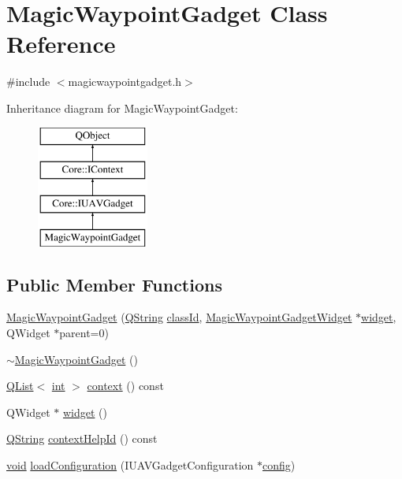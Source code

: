 \hypertarget{class_magic_waypoint_gadget}{\section{Magic\-Waypoint\-Gadget Class Reference}
\label{class_magic_waypoint_gadget}
}


{\ttfamily \#include $<$magicwaypointgadget.\-h$>$}

Inheritance diagram for Magic\-Waypoint\-Gadget\-:\begin{figure}[H]
\begin{center}
\leavevmode
\includegraphics[height=4.000000cm]{class_magic_waypoint_gadget}
\end{center}
\end{figure}
\subsection*{Public Member Functions}
\begin{DoxyCompactItemize}
\item 
\hyperlink{group___g_c_s_control_gadget_plugin_ga7c890e89a9d75c8e6498c9b894ba70ce}{Magic\-Waypoint\-Gadget} (\hyperlink{group___u_a_v_objects_plugin_gab9d252f49c333c94a72f97ce3105a32d}{Q\-String} \hyperlink{group___core_plugin_ga3878fde66a57220608960bcc3fbeef2c}{class\-Id}, \hyperlink{class_magic_waypoint_gadget_widget}{Magic\-Waypoint\-Gadget\-Widget} $\ast$\hyperlink{group___g_c_s_control_gadget_plugin_ga361c7a72cf1a95a2cf36f858d5b9bee5}{widget}, Q\-Widget $\ast$parent=0)
\item 
\hyperlink{group___g_c_s_control_gadget_plugin_ga7caf437fa3df4fc4c30bb259b16d5b89}{$\sim$\-Magic\-Waypoint\-Gadget} ()
\item 
\hyperlink{class_q_list}{Q\-List}$<$ \hyperlink{ioapi_8h_a787fa3cf048117ba7123753c1e74fcd6}{int} $>$ \hyperlink{group___g_c_s_control_gadget_plugin_ga7521519a1bb7dd420c9e4d2f1bf49a2f}{context} () const 
\item 
Q\-Widget $\ast$ \hyperlink{group___g_c_s_control_gadget_plugin_ga361c7a72cf1a95a2cf36f858d5b9bee5}{widget} ()
\item 
\hyperlink{group___u_a_v_objects_plugin_gab9d252f49c333c94a72f97ce3105a32d}{Q\-String} \hyperlink{group___g_c_s_control_gadget_plugin_gab2c239e4a2ee9921f9c9c0c79f769c3e}{context\-Help\-Id} () const 
\item 
\hyperlink{group___u_a_v_objects_plugin_ga444cf2ff3f0ecbe028adce838d373f5c}{void} \hyperlink{group___g_c_s_control_gadget_plugin_ga163d222d9f3681fe93e07da2800e97ae}{load\-Configuration} (I\-U\-A\-V\-Gadget\-Configuration $\ast$\hyperlink{deflate_8c_a4473b5227787415097004fd39f55185e}{config})
\end{DoxyCompactItemize}
